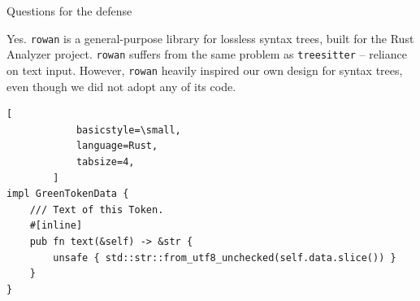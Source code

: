 \documentclass[aspectratio=169]{beamer}
\begin{document}
\begin{frame}[fragile]{Questions for the defense}
\begin{overprint}

		Yes. \texttt{rowan} is a general-purpose library for lossless syntax
		trees, built for the Rust Analyzer project. \texttt{rowan} suffers from
		\alert{the same problem as \texttt{treesitter} -- reliance on text
		input}. However, \texttt{rowan} heavily inspired our own design for
		syntax trees, even though we did not adopt any of its code.

		\begin{lstlisting}[
			basicstyle=\small,
			language=Rust,
			tabsize=4,
		]
impl GreenTokenData {
	/// Text of this Token.
	#[inline]
	pub fn text(&self) -> &str {
		unsafe { std::str::from_utf8_unchecked(self.data.slice()) }
	}
}
		\end{lstlisting}
	\end{overprint}
\end{frame}
\end{document}
